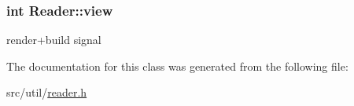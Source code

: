 \hypertarget{class_reader_a4686a622a101960a17a1786a45b84bcd}{}
\subsubsection[{view}]{\setlength{\rightskip}{0pt plus 5cm}int Reader\+::view}\label{class_reader_a4686a622a101960a17a1786a45b84bcd}


render+build signal 



The documentation for this class was generated from the following file\+:\begin{DoxyCompactItemize}
\item 
src/util/\hyperlink{reader_8h}{reader.\+h}\end{DoxyCompactItemize}
